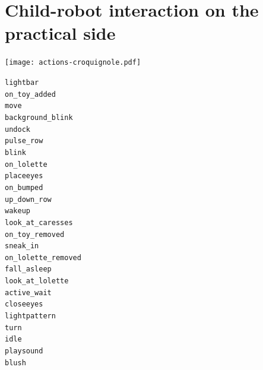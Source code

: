 \documentclass[compress]{beamer}
\begin{document}

\section{Child-robot interaction on the practical side}


{
\begin{frame}{}
    \centering
    \texttt{[image: actions-croquignole.pdf]}

    \begin{multicols}{3}
\scriptsize
{\tt lightbar} \\
{\tt on\_toy\_added} \\
{\tt move} \\
{\tt background\_blink} \\
{\tt undock} \\
{\tt pulse\_row} \\
{\tt blink} \\
{\tt on\_lolette} \\
{\tt placeeyes} \\
{\tt on\_bumped} \\
{\tt up\_down\_row} \\
{\tt wakeup} \\
{\tt look\_at\_caresses} \\
{\tt on\_toy\_removed} \\
{\tt sneak\_in} \\
{\tt on\_lolette\_removed} \\
{\tt fall\_asleep} \\
{\tt look\_at\_lolette} \\
{\tt active\_wait} \\
{\tt closeeyes} \\
{\tt lightpattern} \\
{\tt turn} \\
{\tt idle} \\
{\tt playsound} \\
{\tt blush}

    \end{multicols}
\end{frame}
}
\end{document}
